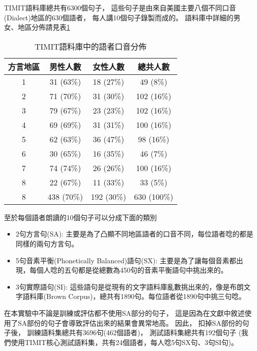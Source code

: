   TIMIT語料庫總共有6300個句子，
  這些句子是由來自美國主要八個不同口音(Dialect)地區的630個語者，
  每人講10個句子錄製而成的。
  語料庫中詳細的男女、地區分佈請見表\ref{tab:timit_dialect_distribution}
  \begin{table}
    \begin{center}
    \scalebox{0.7}
    {
      \begin{tabular}{|c|c|c|c|}
	\hline 方言地區 & 男性人數 & 女性人數 & 總共人數 \\
	\hline 1 & 31 (63\%) & 18 (27\%) & 49 (8\%) \\
	\hline 2 & 71 (70\%) & 31 (30\%) & 102 (16\%) \\
	\hline 3 & 79 (67\%) & 23 (23\%) & 102 (16\%) \\
	\hline 4 & 69 (69\%) & 31 (31\%) & 100 (16\%) \\
	\hline 5 & 62 (63\%) & 36 (47\%) & 98 (16\%) \\
	\hline 6 & 30 (65\%) & 16 (35\%) & 46 (7\%) \\
	\hline 7 & 74 (74\%) & 26 (26\%) & 100 (16\%) \\
	\hline 8 & 22 (67\%) & 11 (33\%) & 33 (5\%) \\
	\hline 8 & 438 (70\%) & 192 (30\%) & 630 (100\%) \\
	\hline
      \end{tabular}
    }
    \caption{TIMIT語料庫中的語者口音分佈}
    \label{tab:timit_dialect_distribution}
    \end{center}
  \end{table}
  至於每個語者朗讀的10個句子可以分成下面的類別
  \begin{itemize}
    \item 2句方言句(SA): 主要是為了凸顯不同地區語者的口音不同，每位語者唸的都是同樣的兩句方言句。
    \item 5句音素平衡(Phonetically Balanced)語句(SX): 主要是為了讓每個音素都出現，每個人唸的五句都是從總數為450句的音素平衡語句中挑出來的。
    \item 3句實際語句(SI): 這些語句是從現有的文字語料庫亂數挑出來的，像是布朗文字語料庫(Brown Corpus)，總共有1890句。每位語者從1890句中挑三句唸。
  \end{itemize}

  在本實驗中不論是訓練或評估都不使用SA部分的句子，
  這是因為在文獻\cite{KaifuLee}中敘述使用了SA部份的句子會導致評估出來的結果會異常地高。
  因此，
  扣掉SA部份的句子後，
  訓練語料集總共有3696句(462個語者)，
  測試語料集總共有192個句子
  (我們使用TIMIT核心測試語料集，共有24個語者，每人唸5句SX句、3句SI句)。

